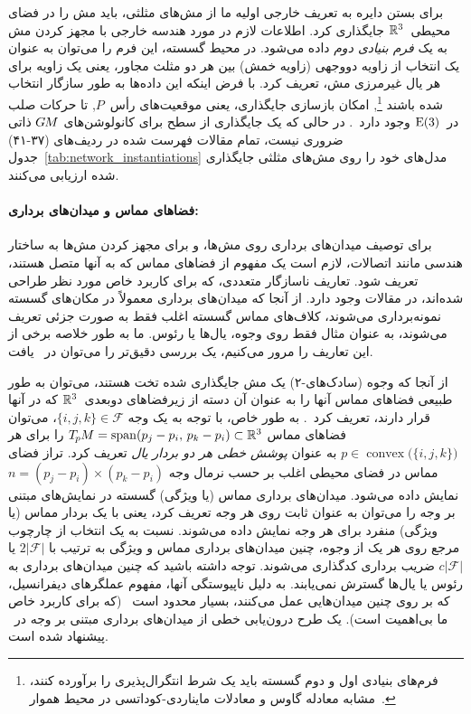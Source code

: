 برای بستن دایره به تعریف خارجی اولیه ما از مش‌های مثلثی، باید مش را در فضای محیطی~$\mathbb{R}^3$ جایگذاری کرد.
اطلاعات لازم در مورد هندسه خارجی با مجهز کردن مش به یک \emph{فرم بنیادی دوم} داده می‌شود.
در محیط گسسته، این فرم را می‌توان به عنوان یک انتخاب از زاویه دووجهی (زاویه خمش) بین هر دو مثلث مجاور، یعنی یک زاویه برای هر یال غیرمرزی مش، تعریف کرد.
با فرض اینکه این داده‌ها به طور سازگار انتخاب شده باشند%
\footnote{
    فرم‌های بنیادی اول و دوم گسسته باید یک شرط انتگرال‌پذیری را برآورده کنند،
    مشابه معادله گاوس و معادلات مایناردی-کوداتسی در محیط هموار~\cite{wang2012surfaceReconstruction}.
},
امکان بازسازی جایگذاری، یعنی موقعیت‌های رأس~$P$, تا حرکات صلب در~$\operatorname{E}(3)$ وجود دارد~\cite{lipman2005linear,wang2012surfaceReconstruction}.
در حالی که یک جایگذاری از سطح برای کانولوشن‌های $G\mkern-1.4muM$ ذاتی ضروری نیست، تمام مقالات فهرست شده در ردیف‌های (۳۷-۴۱) جدول~\ref{tab:network_instantiations} مدل‌های خود را روی مش‌های مثلثی جایگذاری شده ارزیابی می‌کنند.



\paragraph{فضاهای مماس و میدان‌های برداری:}
برای توصیف میدان‌های برداری روی مش‌ها، و برای مجهز کردن مش‌ها به ساختار هندسی مانند اتصالات، لازم است یک مفهوم از فضاهای مماس که به آنها متصل هستند، تعریف شود.
تعاریف ناسازگار متعددی، که برای کاربرد خاص مورد نظر طراحی شده‌اند، در مقالات وجود دارد.
از آنجا که میدان‌های برداری معمولاً در مکان‌های گسسته نمونه‌برداری می‌شوند، کلاف‌های مماس گسسته اغلب فقط به صورت جزئی تعریف می‌شوند، به عنوان مثال فقط روی وجوه، یال‌ها یا رئوس.
ما به طور خلاصه برخی از این تعاریف را مرور می‌کنیم، یک بررسی دقیق‌تر را می‌توان در~\cite{deGoes2016VectorFieldProcessing} یافت.


از آنجا که وجوه (سادک‌های-۲) یک مش جایگذاری شده تخت هستند، می‌توان به طور طبیعی فضاهای مماس آنها را به عنوان آن دسته از زیرفضاهای دوبعدی~$\mathbb{R}^3$ که در آنها قرار دارند، تعریف کرد~\cite{craneTrivialConnectionsDiscrete2010,craneDiscreteDifferentialGeometry2014,wang2012surfaceReconstruction}.
به طور خاص، با توجه به یک وجه $\{i,j,k\} \in \mathcal{F}$، می‌توان فضاهای مماس $T_{\mkern-1.5mu p}\mkern-.5muM = \operatorname{span}(p_j-p_i,\, p_k-p_i) \subset \mathbb{R}^3$ را برای هر $p\in \operatorname{convex}\!\big(\{i,j,k\}\big)$ به عنوان \emph{پوشش خطی هر دو بردار یال} تعریف کرد.
تراز فضای مماس در فضای محیطی اغلب بر حسب نرمال وجه $n = (p_j-p_i) \times (p_k-p_i)$ نمایش داده می‌شود.
میدان‌های برداری مماس (یا ویژگی) گسسته در نمایش‌های مبتنی بر وجه را می‌توان به عنوان ثابت روی هر وجه تعریف کرد، یعنی با یک بردار مماس (یا ویژگی) منفرد برای هر وجه نمایش داده می‌شوند.
نسبت به یک انتخاب از چارچوب مرجع روی هر یک از وجوه، چنین میدان‌های برداری مماس و ویژگی به ترتیب با $2|\mathcal{F}|$ یا $c|\mathcal{F}|$ ضریب برداری کدگذاری می‌شوند.
توجه داشته باشید که چنین میدان‌های برداری به رئوس یا یال‌ها گسترش نمی‌یابند.
به دلیل ناپیوستگی آنها، مفهوم عملگرهای دیفرانسیل، که بر روی چنین میدان‌هایی عمل می‌کنند، بسیار محدود است~\cite{deGoes2016VectorFieldProcessing} (که برای کاربرد خاص ما بی‌اهمیت است).
یک طرح درون‌یابی خطی از میدان‌های برداری مبتنی بر وجه در~\cite{li2006representing} پیشنهاد شده است.


